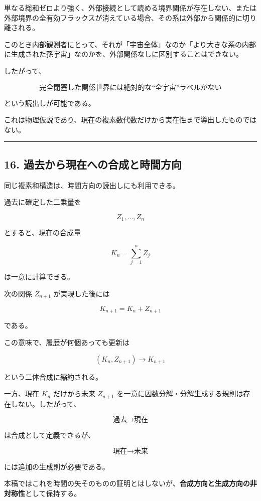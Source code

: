 \documentclass[
  a4paper,
]{ltjsarticle}
\begin{document}
単なる総和ゼロより強く、外部接続として読める境界関係が存在しない、または外部境界の全有効フラックスが消えている場合、その系は外部から関係的に切り離される。

このとき内部観測者にとって、それが「宇宙全体」なのか「より大きな系の内部に生成された孫宇宙」なのかを、外部関係なしに区別することはできない。

したがって、

\[
\boxed{\text{完全閉塞した関係世界には絶対的な“全宇宙”ラベルがない}}
\]

という読出しが可能である。

これは物理仮説であり、現在の複素数代数だけから実在性まで導出したものではない。

\begin{center}\rule{0.5\linewidth}{0.5pt}\end{center}

\subsection{16.
過去から現在への合成と時間方向}\label{ux904eux53bbux304bux3089ux73feux5728ux3078ux306eux5408ux6210ux3068ux6642ux9593ux65b9ux5411}

同じ複素和構造は、時間方向の読出しにも利用できる。

過去に確定した二乗量を

\[
Z_1,\ldots,Z_n
\]

とすると、現在の合成量

\[
K_n=\sum_{j=1}^{n}Z_j
\]

は一意に計算できる。

次の関係 \(Z_{n+1}\) が実現した後には

\[
K_{n+1}=K_n+Z_{n+1}
\]

である。

この意味で、履歴が何個あっても更新は

\[
\boxed{(K_n,Z_{n+1})\to K_{n+1}}
\]

という二体合成に縮約される。

一方、現在 \(K_n\) だけから未来 \(Z_{n+1}\)
を一意に因数分解・分解生成する規則は存在しない。したがって、

\[
\boxed{\text{過去}\to\text{現在}}
\]

は合成として定義できるが、

\[
\boxed{\text{現在}\to\text{未来}}
\]

には追加の生成則が必要である。

本稿ではこれを時間の矢そのものの証明とはしないが、\textbf{合成方向と生成方向の非対称性}として保持する。
\end{document}
